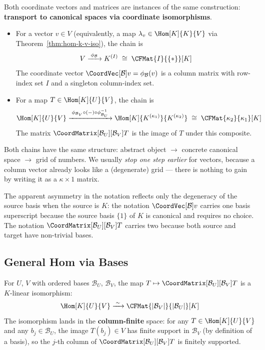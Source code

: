 \begin{remark}
    Both coordinate vectors and matrices are instances of the same construction:
    \textbf{transport to canonical spaces via coordinate isomorphisms}.
    \begin{itemize}
        \item For a vector $v \in V$ (equivalently, a map
              $\lambda_v \in \Hom[K]{K}{V}$ via Theorem~\ref{thm:hom-k-v-iso}),
              the chain is
              \[
                  V \xrightarrow{\;\phi_{\mathcal{B}}\;} K^{(I)}
                  \;\cong\; \CFMat{I}{\{*\}}[K]
              \]
              The coordinate vector $\CoordVec[\mathcal{B}]{v} = \phi_{\mathcal{B}}(v)$
              is a column matrix with row-index set $I$ and a singleton column-index set.
        \item For a map $T \in \Hom[K]{U}{V}$, the chain is
              \[
                  \Hom[K]{U}{V}
                  \xrightarrow{\;\phi_{\mathcal{B}_V} \circ (-) \circ
                  \phi_{\mathcal{B}_U}^{-1}\;}
                  \Hom[K]{K^{(\kappa_1)}}{K^{(\kappa_2)}}
                  \;\cong\; \CFMat{\kappa_2}{\kappa_1}[K]
              \]
              The matrix
              $\CoordMatrix[\mathcal{B}_U][\mathcal{B}_V]{T}$
              is the image of $T$ under this composite.
    \end{itemize}
    Both chains have the same structure: abstract object $\to$ concrete canonical
    space $\to$ grid of numbers. We usually \emph{stop one step earlier} for vectors,
    because a column vector already looks like a (degenerate) grid --- there is nothing to
    gain by writing it as a $\kappa \times 1$ matrix.

    The apparent asymmetry in the notation reflects only the degeneracy of the source basis
    when the source is $K$: the notation $\CoordVec[\mathcal{B}]{v}$ carries one basis
    superscript because the source basis $\{1\}$ of $K$ is canonical and requires no choice.
    The notation $\CoordMatrix[\mathcal{B}_U][\mathcal{B}_V]{T}$ carries two because both
    source and target have non-trivial bases.
\end{remark}

\subsection{General Hom via Bases}

\begin{theorem}
\label{thm:hom-cfmat}
    For $U$, $V$ with ordered bases $\mathcal{B}_U$, $\mathcal{B}_V$, the map
    $T \mapsto \CoordMatrix[\mathcal{B}_U][\mathcal{B}_V]{T}$ is a $K$-linear isomorphism:
    \[
        \Hom[K]{U}{V} \xrightarrow{\;\sim\;}
        \CFMat{|\mathcal{B}_V|}{|\mathcal{B}_U|}[K]
    \]
    The isomorphism lands in the \textbf{column-finite} space: for any
    $T \in \Hom[K]{U}{V}$ and any $b_j \in \mathcal{B}_U$, the image $T(b_j) \in V$ has
    finite support in $\mathcal{B}_V$ (by definition of a basis), so the $j$-th column of
    $\CoordMatrix[\mathcal{B}_U][\mathcal{B}_V]{T}$ is finitely supported.
\end{theorem}

